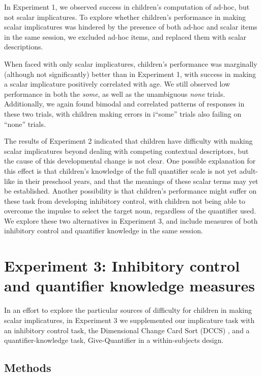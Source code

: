 \documentclass[man]{apa2}
\begin{document}
In Experiment 1, we observed success in children's computation of ad-hoc, but not scalar implicatures. To explore whether children's performance in making scalar implicatures was hindered by the presence of both ad-hoc and scalar items in the same session, we excluded ad-hoc items, and replaced them with scalar descriptions. 

When faced with only scalar implicatures, children's performance was marginally (although not significantly) better than in Experiment 1, with success in making a scalar implicature positively correlated with age. We still observed low performance in both the \textit{some}, as well as the unambiguous \textit{none} trials. Additionally, we again found bimodal and correlated patterns of responses in these two trials, with children making errors in i``some'' trials also failing on ``none'' trials. 

The results of Experiment 2 indicated that children have difficulty with making scalar implicatures beyond dealing with competing contextual descriptors, but the cause of this developmental change is not clear. One possible explanation for this effect is that children's knowledge of the full quantifier scale is not yet adult-like in their preschool years, and that the meanings of these scalar terms may yet be established. Another possibility is that children's performance might suffer on these task from developing inhibitory control, with children not being able to overcome the impulse to select the target noun, regardless of the quantifier used. We explore these two alternatives in Experiment 3, and include measures of both inhibitory control and quantifier knowledge in the same session. 

				
\section{Experiment 3: Inhibitory control and quantifier knowledge measures}

In an effort to explore the particular sources of difficulty for children in making scalar implicatures, in Experiment 3 we supplemented our implicature task with an inhibitory control task, the Dimensional Change Card Sort (DCCS) \cite{zelazo2006}, and a quantifier-knowledge task, Give-Quantifier \cite{barner2009} in a within-subjects design.  

\subsection{Methods}
\end{document}
